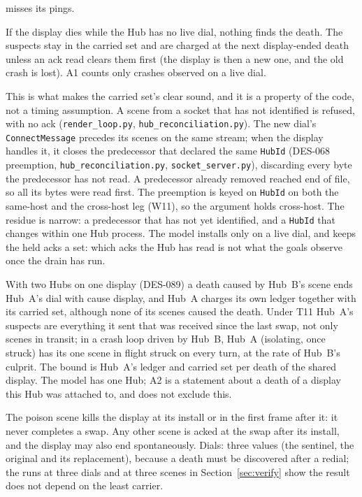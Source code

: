 \documentclass[a4paper,10pt,fleqn]{article}
\begin{document}
\begin{description}
    misses its pings.
  \item[B4  A crash with no dial live is not observed.]  If the display dies
    while the Hub has no live dial, nothing finds the death.  The suspects stay in
    the carried set and are charged at the next display-ended death unless an
    ack read clears them first (the display is then a new one, and the old
    crash is lost).  A1 counts only crashes observed on a live dial.
  \item[O7  Ordering: no earlier dial's scene is installed after a later dial's.]
    This is what makes the carried set's clear sound, and it is a property of
    the code, not a timing assumption.  A scene from a socket that has not
    identified is refused, with no ack (\texttt{render\_loop.py},
    \texttt{hub\_reconciliation.py}).  The new dial's \texttt{ConnectMessage}
    precedes its scenes on the same stream; when the display handles it, it
    closes the predecessor that declared the same \texttt{HubId} (DES-068
    preemption, \texttt{hub\_reconciliation.py}, \texttt{socket\_server.py}),
    discarding every byte the predecessor has not read.  A predecessor already
    removed reached end of file, so all its bytes were read first.  The
    preemption is keyed on \texttt{HubId} on both the same-host and the
    cross-host leg (W11), so the argument holds cross-host.  The residue is
    narrow: a predecessor that has not yet identified, and a \texttt{HubId}
    that changes within one Hub process.  The model installs only on a live
    dial, and keeps the held acks a set: which acks the Hub has read is not
    what the goals observe once the drain has run.
  \item[B7  Several Hubs on one display.]  With two Hubs on one display (DES-089)
    a death caused by Hub~B's scene ends Hub~A's dial with cause display, and Hub~A
    charges its own ledger together with its carried set, although none of its
    scenes caused the death.  Under T11 Hub~A's suspects are everything it sent
    that was received since the last swap, not only scenes in transit; in a
    crash loop driven by Hub~B, Hub~A (isolating, once struck) has its one scene
    in flight struck on every turn, at the rate of Hub~B's culprit.  The bound
    is Hub~A's ledger and carried set per death of the shared display.  The
    model has one Hub; A2 is a statement about a death of a display this Hub was
    attached to, and does not exclude this.
  \item[B6  The poison scene.]  The poison scene kills the display at its
    install or in the first frame after it: it never completes a swap.  Any
    other scene is acked at the swap after its install, and the display may
    also end spontaneously.  Dials: three values (the sentinel, the original and
    its replacement), because a death must be discovered after a redial; the
    runs at three dials and at three scenes in Section~\ref{sec:verify} show the
    result does not depend on the least carrier.
\end{description}
\end{document}
